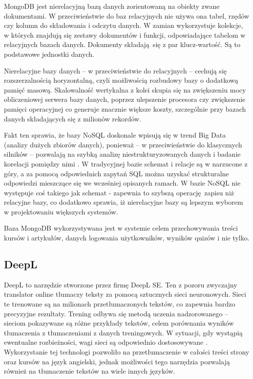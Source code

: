 \documentclass[12pt,twoside]{article}
\begin{document}
MongoDB jest nierelacyjną bazą danych zorientowaną na obiekty zwane dokumentami. W przeciwieństwie do baz relacyjnych nie używa ona tabel, rzędów czy kolumn do składowania i odczytu danych. W zamian wykorzystuje kolekcje, w których znajdują się zestawy dokumentów i funkcji, odpowiadające tabelom w relacyjnych bazach danych. Dokumenty składają się z par klucz-wartość. Są to podstawowe jednostki danych. 

Nierelacyjne bazy danych -- w przeciwieństwie do relacyjnych -- cechują się rozszerzalnością horyzontalną, czyli możliwością rozbudowy bazy o dodatkową pamięć masową. Skalowalność wertykalna z kolei skupia się na zwiększeniu mocy obliczeniowej serwera bazy danych, poprzez ulepszenie procesora czy zwiększenie pamięci operacyjnej co generuje znacznie większe koszty, szczególnie przy bazach danych składających się z milionów rekordów. 

Fakt ten sprawia, że bazy NoSQL doskonale wpisują się w trend Big Data (analizy dużych zbiorów danych), ponieważ – w przeciwieństwie do klasycznych silników – pozwalają na szybką analizę niestrukturyzowanych danych i badanie korelacji pomiędzy nimi \cite{BigData}. W tradycyjnej bazie schemat i relacje są w narzucone z góry, a za pomocą odpowiednich zapytań SQL można uzyskać strukturalne odpowiedzi mieszczące się we wcześniej opisanych ramach. W bazie NoSQL nie występuje coś takiego jak schemat - zapewnia to szybszą operację zapisu niż relacyjne bazy, co dodatkowo sprawia, iż nierelacyjne bazy są lepszym wyborem w projektowaniu większych systemów.
 
Baza MongoDB wykorzystywana jest w systemie celem przechowywania treści kursów i artykułów, danych logowania użytkowników, wyników quizów i nie tylko.

\subsection{DeepL}
DeepL to narzędzie stworzone przez firmę DeepL SE. Ten z pozoru zwyczajny translator online tłumaczy teksty za pomocą sztucznych sieci neuronowych. Sieci te trenowane są na milionach przetłumaczonych tekstów, co zapewnia bardzo precyzyjne rezultaty. Trening odbywa się metodą uczenia nadzorowanego -- sieciom pokazywane są różne przykłady tekstów, celem porównania wyników tłumaczenia z tłumaczeniami z danych treningowych. W sytuacji, gdy wystąpią ewentualne rozbieżności, wagi sieci są odpowiednio dostosowywane \cite{Deepl}. Wykorzystanie tej technologi pozwoliło na przetłumaczenie w całości treści strony oraz kursów na język angielski, jednak możliwości tego narzędzia pozwalają również na tłumaczenie tekstów na wiele innych języków. 
 
\end{document}
